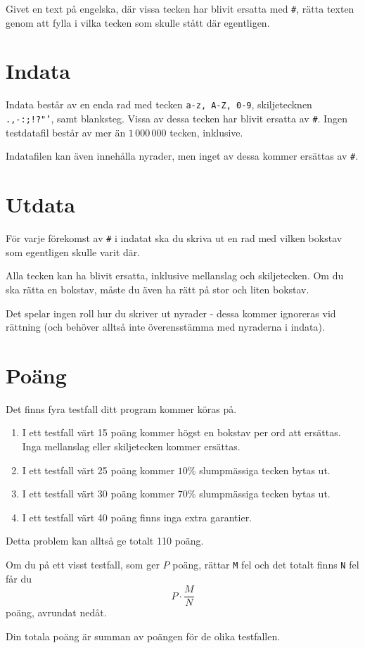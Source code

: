
Givet en text på engelska, där vissa tecken har blivit ersatta med \texttt{\#}, rätta texten genom att fylla i vilka tecken som skulle stått där egentligen.

\section*{Indata}
Indata består av en enda rad med tecken \texttt{a-z, A-Z, 0-9}, skiljetecknen \texttt{.,-:;!?"'}, samt blanksteg. Vissa av dessa tecken har blivit ersatta av \texttt{\#}.
Ingen testdatafil består av mer än $1\,000\,000$ tecken, inklusive.

Indatafilen kan även innehålla nyrader, men inget av dessa kommer ersättas av \texttt{\#}.

\section*{Utdata}
För varje förekomst av \texttt{\#} i indatat ska du skriva ut en rad med vilken bokstav som egentligen skulle varit där.

Alla tecken kan ha blivit ersatta, inklusive mellanslag och skiljetecken. Om du ska rätta en bokstav, måste du även ha rätt på stor och liten bokstav.

Det spelar ingen roll hur du skriver ut nyrader - dessa kommer ignoreras vid rättning (och behöver alltså inte överensstämma med nyraderna i indata).

\section*{Poäng}

Det finns fyra testfall ditt program kommer köras på.
\begin{enumerate}
  \item I ett testfall värt 15 poäng kommer högst en bokstav per ord att ersättas. Inga mellanslag eller skiljetecken kommer ersättas.
  \item I ett testfall värt 25 poäng kommer $10\%$ slumpmässiga tecken bytas ut.
  \item I ett testfall värt 30 poäng kommer $70\%$ slumpmässiga tecken bytas ut.
  \item I ett testfall värt 40 poäng finns inga extra garantier.
\end{enumerate}

Detta problem kan alltså ge totalt 110 poäng.

Om du på ett visst testfall, som ger $P$ poäng, rättar \texttt{M} fel och det totalt finns \texttt{N} fel får du 
$$P \cdot \frac{M}{N}$$
poäng, avrundat nedåt.

Din totala poäng är summan av poängen för de olika testfallen.
